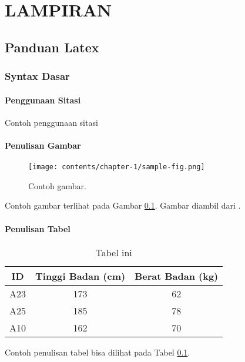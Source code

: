 \chapter*{LAMPIRAN}

\section{Panduan Latex}

\subsection{Syntax Dasar}



\subsubsection{Penggunaan Sitasi}
Contoh penggunaan sitasi \cite{lukito2016,santosa2011user}
\cite{setiawan2014fuzzy} \cite{wibowo2014line} \cite{marenda2016digitory} \cite{wibirama2013dual,wibowo2016clustering}

\subsubsection{Penulisan Gambar}

\begin{figure}[h]
	\centering
	\texttt{[image: contents/chapter-1/sample-fig.png]}
	\caption{Contoh gambar.}
	\label{Fig: Contoh gambar}
\end{figure}

Contoh gambar terlihat pada Gambar \ref{Fig: Contoh gambar}. Gambar diambil dari \cite{wibowo2016clustering}.

\subsubsection{Penulisan Tabel}
\begin{table}[h]
	\caption{Tabel ini}
	\vspace{0.5em}
	\centering
	\begin{tabular}{|c|c|c|}
		\hline
		ID & Tinggi Badan (cm) & Berat Badan (kg) \\
		\hline \hline
		A23 & 173 & 62 \\
		A25 & 185 & 78 \\
		A10 & 162 & 70 \\ \hline
	\end{tabular}
	\label{Tab: Tabel Tinggi Berat}
\end{table}
Contoh penulisan tabel bisa dilihat pada Tabel \ref{Tab: Tabel Tinggi Berat}.

